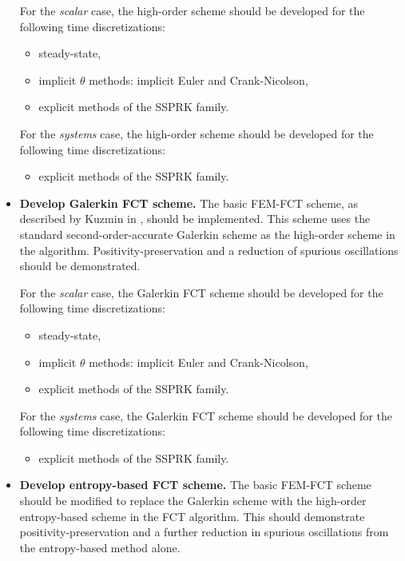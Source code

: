 \begin{itemize}
    For the \emph{scalar} case, the high-order scheme should be
    developed for the following time discretizations:
    \begin{itemize}
      \item steady-state,
      \item implicit $\theta$ methods: implicit Euler and Crank-Nicolson,
      \item explicit methods of the SSPRK family.
    \end{itemize}
    For the \emph{systems} case, the high-order scheme should be
    developed for the following time discretizations:
    \begin{itemize}
      \item explicit methods of the SSPRK family.
    \end{itemize}
  \item \textbf{Develop Galerkin FCT scheme.}
    The basic FEM-FCT scheme, as described by Kuzmin in \cite{kuzmin_FCT}, should
    be implemented. This scheme uses the standard second-order-accurate Galerkin
    scheme as the high-order scheme in the algorithm. Positivity-preservation and
    a reduction of spurious oscillations should be demonstrated.

    For the \emph{scalar} case, the Galerkin FCT scheme should be
    developed for the following time discretizations:
    \begin{itemize}
      \item steady-state,
      \item implicit $\theta$ methods: implicit Euler and Crank-Nicolson,
      \item explicit methods of the SSPRK family.
    \end{itemize}
    For the \emph{systems} case, the Galerkin FCT scheme should be
    developed for the following time discretizations:
    \begin{itemize}
      \item explicit methods of the SSPRK family.
    \end{itemize}
  \item \textbf{Develop entropy-based FCT scheme.}
    The basic FEM-FCT scheme should be modified to replace the Galerkin scheme
    with the high-order entropy-based scheme in the FCT algorithm. This should
    demonstrate positivity-preservation and a further reduction in spurious
    oscillations from the entropy-based method alone.


\end{itemize}
